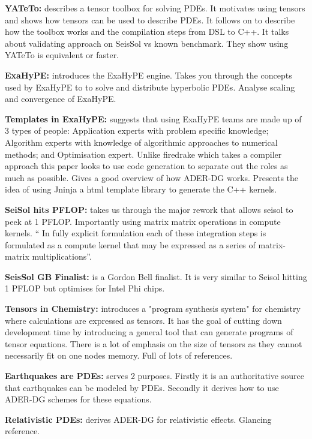 \textbf{YATeTo:} \cite{YATeTo} describes a tensor toolbox for solving PDEs. 
It motivates using tensors and shows how tensors can be used to describe PDEs. 
It follows on to describe how the toolbox works and the compilation steps from DSL to C++. 
It talks about validating approach on SeisSol vs known benchmark. 
They show using YATeTo is equivalent or faster.

\textbf{ExaHyPE:} \cite{exahype} introduces the ExaHyPE engine. 
Takes you through the concepts used by ExaHyPE to to solve and distribute hyperbolic PDEs. 
Analyse scaling and convergence of ExaHyPE.

\textbf{Templates in ExaHyPE:} \cite{templateExahype} suggests that using ExaHyPE teams are made up of 3 types of people: Application experts with problem specific knowledge; Algorithm experts with knowledge of algorithmic approaches to numerical methods; and Optimisation expert. 
Unlike firedrake which takes a compiler approach this paper looks to use code generation to separate out the roles as much as possible. 
Gives a good overview of how ADER-DG works. 
Presents the idea of using Jninja a html template library to generate the C++ kernels.

\textbf{SeiSol hits PFLOP:} \cite{seisolPFLOP} takes us through the major rework that allows seisol to peek at 1 PFLOP. Importantly using matrix matrix operations in compute kernels.
`` In fully explicit
formulation each of these integration steps is formulated as a compute kernel
that may be expressed as a series of matrix-matrix multiplications''.

\textbf{SeisSol GB Finalist:} \cite{gbseisolPFLOP} is a Gordon Bell finalist.
It is very similar to Seisol hitting 1 PFLOP but optimises for Intel Phi chips.

\textbf{Tensors in Chemistry:} \cite{tensorChemistry} introduces a "program synthesis system" for chemistry where calculations are expressed as tensors.
It has the goal of cutting down development time by introducing a general tool that can generate programs of tensor equations.
There is a lot of emphasis on the size of tensors as they cannot necessarily fit on one nodes memory.
Full of lots of references.

\textbf{Earthquakes are PDEs:} \cite{earthquakePDE} serves 2 purposes. Firstly it is an authoritative source that earthquakes can be modeled by PDEs. Secondly it derives how to use ADER-DG schemes for these equations.

\textbf{Relativistic PDEs:} \cite{relativisticPDE} derives ADER-DG for relativistic effects. Glancing reference.

